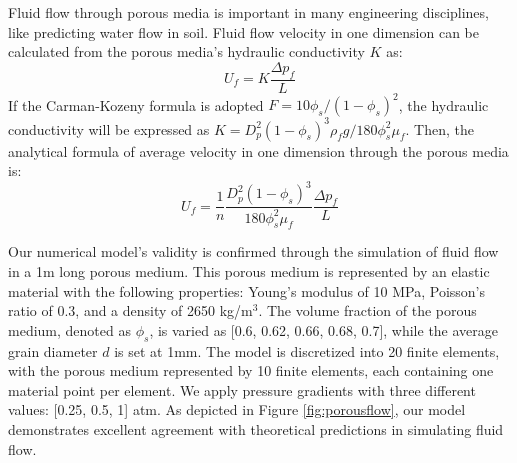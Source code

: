 \documentclass[preprint,12pt]{elsarticle}
\begin{document}
%
%
Fluid flow through porous media is important in many engineering disciplines, like predicting water flow in soil. Fluid flow velocity in one dimension can be calculated from the porous media's hydraulic conductivity $K$ as:\\
%
%
\begin{equation}
  {U}_f   = K \frac{\Delta p_f}{L}
\end {equation}
%
%
If the Carman-Kozeny formula is adopted $F = 10\phi_s/(1-\phi_s)^2$, the hydraulic conductivity will be expressed as  $K = D_p^2 (1-\phi_s)^3 \rho_f  g / 180 \phi_s^2  \mu_f $. Then, the analytical formula of average velocity in one dimension through the porous media is:\\
%
%
\begin{equation}
  {U}_f  = \frac{1}{n} \frac{D_p^2 (1-\phi_s)^3}{180 \phi_s^2 \mu_f} \frac{\Delta p_f}{L}
\end {equation}

%
%
Our numerical model's validity is confirmed through the simulation of fluid flow in a 1m long porous medium. This porous medium is represented by an elastic material with the following properties: Young's modulus of 10 MPa, Poisson's ratio of 0.3, and a density of 2650 kg/m$^{3}$. The volume fraction of the porous medium, denoted as $\phi_s$, is varied as [0.6, 0.62, 0.66, 0.68, 0.7], while the average grain diameter $d$ is set at 1mm. The model is discretized into 20 finite elements, with the porous medium represented by 10 finite elements, each containing one material point per element. We apply pressure gradients with three different values: [0.25, 0.5, 1] atm. As depicted in Figure \ref{fig:porousflow}, our model demonstrates excellent agreement with theoretical predictions in simulating fluid flow.
%
\end{document}

